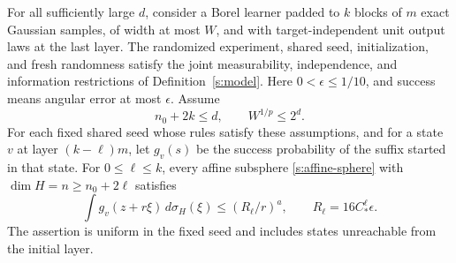 \begin{proposition}\label{s:affine-proposition}
For all sufficiently large \(d\), consider a Borel learner padded to
\(k\) blocks of \(m\) exact Gaussian samples, of width at most \(W\),
and with target-independent unit output laws at the last layer.
The randomized experiment, shared seed, initialization, and fresh
randomness satisfy the joint measurability, independence, and
information restrictions of Definition~\ref{s:model}. Here
\(0<\epsilon\le1/10\), and success means angular error at most
\(\epsilon\).
Assume
\begin{equation}\label{s:affine-budget}
 n_0+2k\le d,\qquad W^{1/p}\le2^d.
\end{equation}
For each fixed shared seed whose rules satisfy these assumptions, and
for a state \(v\) at layer \((k-\ell)m\), let \(g_v(s)\) be the
success probability of the suffix started in that state. For
\(0\le\ell\le k\), every affine subsphere \eqref{s:affine-sphere}
with \(\dim H=n\ge n_0+2\ell\) satisfies
\begin{equation}\label{s:affine-invariant-bound}
 \int g_v(z+r\xi)\,d\sigma_H(\xi)
 \le (R_\ell/r)^a,\qquad R_\ell=16C_*^\ell\epsilon.
\end{equation}
The assertion is uniform in the fixed seed and includes states
unreachable from the initial layer.
\end{proposition}
